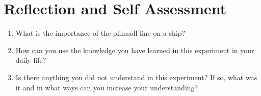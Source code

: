 \section{Reflection and Self Assessment}
\begin{enumerate}
\item What is the importance of the plimsoll line on a ship?
\item How can you use the knowledge you have learned in this experiment in your daily life?
\item Is there anything you did not understand in this experiment? If so, what was it and in what ways can you increase your understanding? 
\end{enumerate}